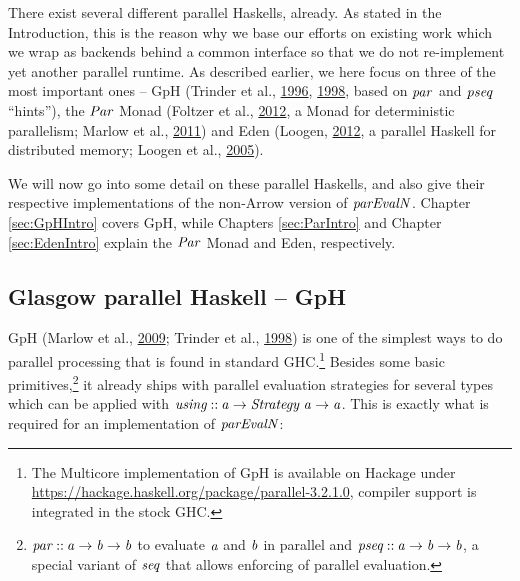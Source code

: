 \documentclass[paper=A4,twoside=true,openright,parskip=full,chapterprefix=true,headings=normal,bibliography=totoc,listof=totoc,titlepage=on,captions=tableabove,draft=false,british]{scrreprt}%
\renewcommand{\enquote}[1]{{``}#1{''}}
\begin{document}
There exist several different parallel Haskells, already. As stated in
the Introduction, this is the reason why we base our efforts on existing
work which we wrap as backends behind a common interface so that we do
not re-implement yet another parallel runtime. As described earlier, we
here focus on three of the most important ones -- GpH (Trinder et al.,
\protect\hyperlink{ref-Trinder1996}{1996},
\protect\hyperlink{ref-Trinder1998a}{1998}, based on \ensuremath{\Varid{par}} and \ensuremath{\Varid{pseq}}
\enquote{hints}), the \ensuremath{\Conid{Par}} Monad (Foltzer et al.,
\protect\hyperlink{ref-Foltzer:2012:MPC:2398856.2364562}{2012}, a Monad
for deterministic parallelism; Marlow et al.,
\protect\hyperlink{ref-par-monad}{2011}) and Eden (Loogen,
\protect\hyperlink{ref-Loogen2012}{2012}, a parallel Haskell for
distributed memory; Loogen et al., \protect\hyperlink{ref-eden}{2005}).

We will now go into some detail on these parallel Haskells, and also
give their respective implementations of the non-Arrow version of
\ensuremath{\Varid{parEvalN}}. Chapter \ref{sec:GpHIntro} covers GpH, while Chapters
\ref{sec:ParIntro} and Chapter \ref{sec:EdenIntro} explain the \ensuremath{\Conid{Par}}
Monad and Eden, respectively.

\hypertarget{glasgow-parallel-haskell-gph}{%
\subsection{Glasgow parallel Haskell --
GpH}\label{glasgow-parallel-haskell-gph}}

\label{sec:GpHIntro}

GpH (Marlow et al., \protect\hyperlink{ref-Marlow2009}{2009}; Trinder et
al., \protect\hyperlink{ref-Trinder1998a}{1998}) is one of the simplest
ways to do parallel processing that is found in standard GHC.\footnote{The
  Multicore implementation of GpH is available on Hackage under
  \url{https://hackage.haskell.org/package/parallel-3.2.1.0}, compiler
  support is integrated in the stock GHC.} Besides some basic
primitives,\footnote{\ensuremath{\Varid{par}\mathbin{::}\Varid{a}\to \Varid{b}\to \Varid{b}} to evaluate \ensuremath{\Varid{a}} and \ensuremath{\Varid{b}} in
  parallel and \ensuremath{\Varid{pseq}\mathbin{::}\Varid{a}\to \Varid{b}\to \Varid{b}}, a special variant of \ensuremath{\Varid{seq}} that
  allows enforcing of parallel evaluation.} it already ships with
parallel evaluation strategies for several types which can be applied
with \ensuremath{\Varid{using}\mathbin{::}\Varid{a}\to \Conid{Strategy}\;\Varid{a}\to \Varid{a}}. This is exactly what is required
for an implementation of \ensuremath{\Varid{parEvalN}}:
\end{document}
